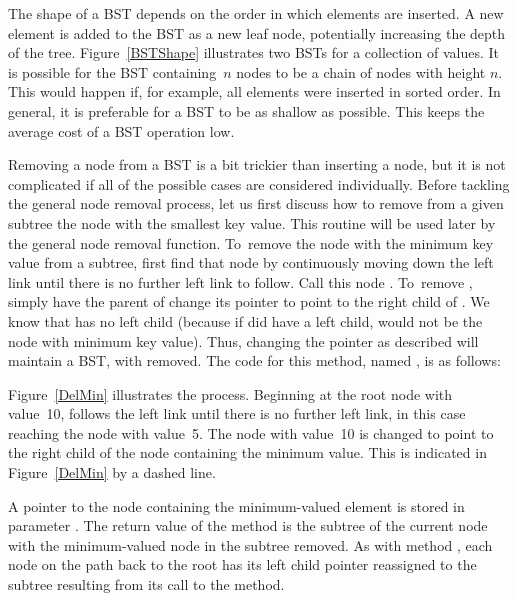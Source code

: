 The shape of a BST depends on the order in which elements are inserted.
A new element is added to the BST as a new leaf node,
potentially increasing the depth of the tree.
Figure~\ref{BSTShape} illustrates two BSTs for a collection of
values.
It is possible for the BST containing~\(n\) nodes to be a chain of
nodes with height \(n\).
This would happen if, for example, all elements were inserted in
sorted order.
In general, it is preferable for a BST to be as shallow as
possible.
This keeps the average cost of a BST operation low.

Removing a node from a BST is a bit trickier than inserting a node,
but it is not complicated if all of the possible cases are considered
individually.
Before tackling the general node removal process, let us first discuss
how to remove from a given subtree the node with the smallest key
value.
This routine will be used later by the general node removal function.
To~remove the node with the minimum key value from a subtree,
first find that node by continuously moving down the left link until
there is no further left link to follow.
Call this node .
To~remove , simply have the parent of  change its
pointer to point to the right child of .
We know that  has no left child (because if  did have
a left child,  would not be the node with minimum key value).
Thus, changing the pointer as described will maintain a BST, with
 removed.
The code for this method, named , is as follows:


\begin{example}
Figure~\ref{DelMin} illustrates the  process.
Beginning at the root node with value~10,
 follows the left link until there is no further left
link, in this case reaching the node with value~5.
The node with value~10 is changed to point to the right child of the
node containing the minimum value.
This is indicated in Figure~\ref{DelMin} by a dashed line.
\end{example}

A pointer to the node containing the minimum-valued element is stored
in parameter .
The return value of the  method is the subtree of
the current node with the minimum-valued node in the subtree removed.
As with method , each node on the path back to the
root has its left child pointer reassigned to the subtree resulting
from its call to the  method.

